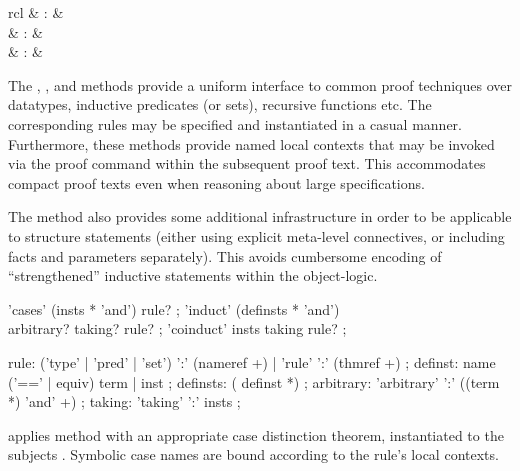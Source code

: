\begin{isabellebody}
\begin{isamarkuptext}
\begin{descr}
  \end{descr}%
\end{isamarkuptext}%
\isamarkuptrue%
%
\isamarkuptrue%
%
\begin{isamarkuptext}%
\begin{matharray}{rcl}
    \mbox{} & : & \isarmeth \\
    \mbox{} & : & \isarmeth \\
    \mbox{} & : & \isarmeth \\
  \end{matharray}

  The \mbox{}, \mbox{}, and \mbox{}
  methods provide a uniform interface to common proof techniques over
  datatypes, inductive predicates (or sets), recursive functions etc.
  The corresponding rules may be specified and instantiated in a
  casual manner.  Furthermore, these methods provide named local
  contexts that may be invoked via the \mbox{} proof command
  within the subsequent proof text.  This accommodates compact proof
  texts even when reasoning about large specifications.

  The \mbox{} method also provides some additional
  infrastructure in order to be applicable to structure statements
  (either using explicit meta-level connectives, or including facts
  and parameters separately).  This avoids cumbersome encoding of
  ``strengthened'' inductive statements within the object-logic.

  \begin{rail}
    'cases' (insts * 'and') rule?
    ;
    'induct' (definsts * 'and') \\ arbitrary? taking? rule?
    ;
    'coinduct' insts taking rule?
    ;

    rule: ('type' | 'pred' | 'set') ':' (nameref +) | 'rule' ':' (thmref +)
    ;
    definst: name ('==' | equiv) term | inst
    ;
    definsts: ( definst *)
    ;
    arbitrary: 'arbitrary' ':' ((term *) 'and' +)
    ;
    taking: 'taking' ':' insts
    ;
  \end{rail}

  \begin{descr}

  \item [\mbox{\isa{cases}}~\isa{{\isachardoublequote}insts\ R{\isachardoublequote}}] applies method \mbox{} with an appropriate case distinction theorem, instantiated to
  the subjects .  Symbolic case names are bound according
  to the rule's local contexts.


\end{descr}
\end{isamarkuptext}
\end{isabellebody}
